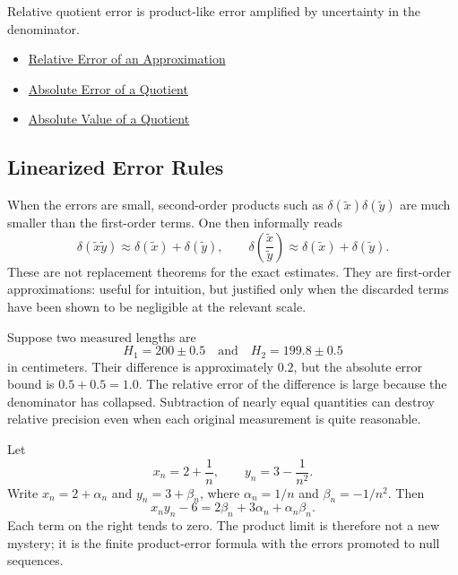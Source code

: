 \begin{remark*}[Interpretation]
Relative quotient error is product-like error amplified by uncertainty in the denominator.
\end{remark*}

\begin{dependencies}
\begin{itemize}
  \item \hyperref[def:relative-error-approximation]{Relative Error of an Approximation}
  \item \hyperref[thm:absolute-error-quotient]{Absolute Error of a Quotient}
  \item \hyperref[thm:absolute-value-quotient]{Absolute Value of a Quotient}
\end{itemize}
\end{dependencies}

\subsection*{Linearized Error Rules}

\begin{remark*}
When the errors are small, second-order products such as
$\delta(\widetilde{x})\delta(\widetilde{y})$ are much smaller than the
first-order terms. One then informally reads
\[
  \delta(\widetilde{x}\widetilde{y})
  \approx
  \delta(\widetilde{x})+\delta(\widetilde{y}),
  \qquad
  \delta\!\left(\frac{\widetilde{x}}{\widetilde{y}}\right)
  \approx
  \delta(\widetilde{x})+\delta(\widetilde{y}).
\]
These are not replacement theorems for the exact estimates. They are
first-order approximations: useful for intuition, but justified only when
the discarded terms have been shown to be negligible at the relevant scale.
\end{remark*}

\begin{example*}
Suppose two measured lengths are
\[
  H_1=200\pm 0.5\quad\text{and}\quad H_2=199.8\pm 0.5
\]
in centimeters. Their difference is approximately $0.2$, but the absolute
error bound is $0.5+0.5=1.0$. The relative error of the difference is large
because the denominator has collapsed. Subtraction of nearly equal quantities
can destroy relative precision even when each original measurement is quite
reasonable.
\end{example*}

\begin{example*}
Let
\[
  x_n=2+\frac{1}{n},\qquad
  y_n=3-\frac{1}{n^2}.
\]
Write $x_n=2+\alpha_n$ and $y_n=3+\beta_n$, where
$\alpha_n=1/n$ and $\beta_n=-1/n^2$. Then
\[
  x_ny_n-6
  =
  2\beta_n+3\alpha_n+\alpha_n\beta_n.
\]
Each term on the right tends to zero. The product limit is therefore not a
new mystery; it is the finite product-error formula with the errors promoted
to null sequences.
\end{example*}
